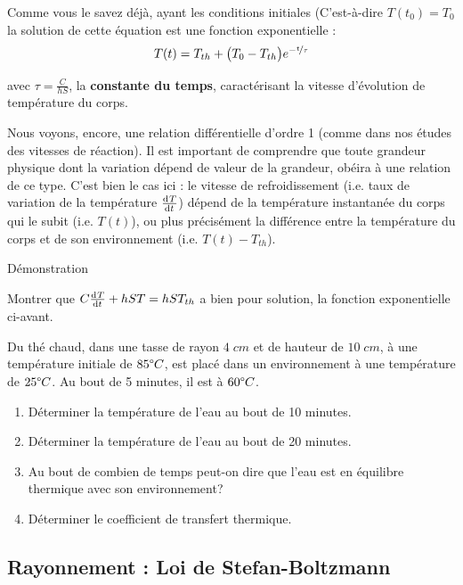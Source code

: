 \documentclass[11pt,a4paper]{article}
\begin{document}
Comme vous le savez déjà, ayant les conditions initiales (C'est-à-dire $T(t_0) = T_0$ la solution de cette équation est une fonction exponentielle : 
\[ T(t) = T_{th} +\big( T_0 - T_{th} \big)e^{-\nicefrac{t}{\tau}}   \]

avec $\tau = \frac{C}{hS}$, la \textbf{constante du temps}, caractérisant la vitesse d'évolution de température du corps. 

\begin{rmrq}
Nous voyons, encore, une relation différentielle d'ordre 1 (comme dans nos études des vitesses de réaction). Il est important de comprendre que toute grandeur physique dont la variation dépend de valeur de la grandeur, obéira à une relation de ce type. C'est bien le cas ici : le vitesse de refroidissement (i.e. taux de variation de la température $\od{T}{t}$) dépend de la température instantanée du corps qui le subit (i.e. $T(t)$), ou plus précisément la différence entre la température du corps et de son environnement (i.e. $T(t) - T_{th}$). 
\end{rmrq}


\begin{exo}{Démonstration}

Montrer que  $C\od{T}{t} + hST =  hS T_{th}$ a bien pour solution, la fonction exponentielle ci-avant. 
\vspace{4cm}
\end{exo}

\begin{exo}
Du thé chaud, dans une tasse de rayon $4\; cm$ et de hauteur de $10\; cm$, à une température initiale de $85\degree C$, est placé dans un environnement à une température de $25\degree C$. Au bout de 5 minutes, il est à $60\degree C$. 
\begin{enumerate}
    \item Déterminer la température de l'eau au bout de 10 minutes. 
    \item Déterminer la température de l'eau au bout de 20 minutes. 
    \item Au bout de combien de temps peut-on dire que l'eau est en équilibre thermique avec son environnement? 
    \item Déterminer le coefficient de transfert thermique. 
\end{enumerate}
\vspace{10cm}
\end{exo}

\subsection{Rayonnement : Loi de Stefan-Boltzmann}
\end{document}
